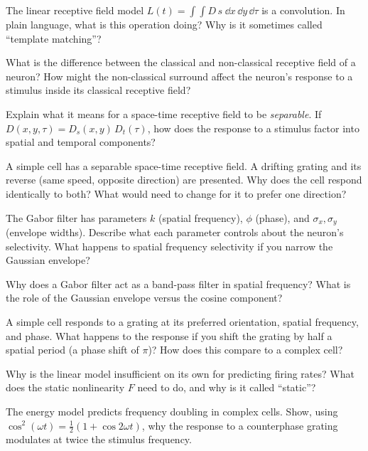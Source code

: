 \begin{conceptquestions}
  \item The linear receptive field model $L(t) = \int\!\!\int D\,s\;\dd x\,\dd y\,\dd\tau$ is a convolution. In plain language, what is this operation doing? Why is it sometimes called ``template matching''?

  \item What is the difference between the classical and non-classical receptive field of a neuron? How might the non-classical surround affect the neuron's response to a stimulus inside its classical receptive field?

  \item Explain what it means for a space-time receptive field to be \emph{separable}. If $D(x,y,\tau) = D_s(x,y)\,D_t(\tau)$, how does the response to a stimulus factor into spatial and temporal components?

  \item A simple cell has a separable space-time receptive field. A drifting grating and its reverse (same speed, opposite direction) are presented. Why does the cell respond identically to both? What would need to change for it to prefer one direction?

  \item The Gabor filter has parameters $k$ (spatial frequency), $\phi$ (phase), and $\sigma_x, \sigma_y$ (envelope widths). Describe what each parameter controls about the neuron's selectivity. What happens to spatial frequency selectivity if you narrow the Gaussian envelope?

  \item Why does a Gabor filter act as a band-pass filter in spatial frequency? What is the role of the Gaussian envelope versus the cosine component?

  \item A simple cell responds to a grating at its preferred orientation, spatial frequency, and phase. What happens to the response if you shift the grating by half a spatial period (a phase shift of $\pi$)? How does this compare to a complex cell?

  \item Why is the linear model insufficient on its own for predicting firing rates? What does the static nonlinearity $F$ need to do, and why is it called ``static''?

  \item The energy model predicts frequency doubling in complex cells. Show, using $\cos^2(\omega t) = \frac{1}{2}(1 + \cos 2\omega t)$, why the response to a counterphase grating modulates at twice the stimulus frequency.


\end{conceptquestions}
